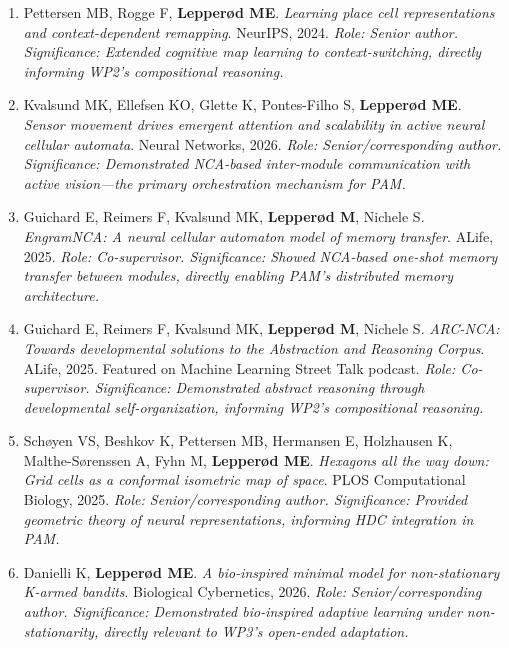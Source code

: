 \begin{enumerate}[noitemsep,topsep=2pt]
  \item Pettersen MB, Rogge F, \textbf{Lepperød ME}. \textit{Learning place cell representations and context-dependent remapping}. NeurIPS, 2024.
  \textit{Role: Senior author. Significance: Extended cognitive map learning to context-switching, directly informing WP2's compositional reasoning.}

  \item Kvalsund MK, Ellefsen KO, Glette K, Pontes-Filho S, \textbf{Lepperød ME}. \textit{Sensor movement drives emergent attention and scalability in active neural cellular automata}. Neural Networks, 2026.
  \textit{Role: Senior/corresponding author. Significance: Demonstrated NCA-based inter-module communication with active vision---the primary orchestration mechanism for PAM.}

  \item Guichard E, Reimers F, Kvalsund MK, \textbf{Lepperød M}, Nichele S. \textit{EngramNCA: A neural cellular automaton model of memory transfer}. ALife, 2025.
  \textit{Role: Co-supervisor. Significance: Showed NCA-based one-shot memory transfer between modules, directly enabling PAM's distributed memory architecture.}

  \item Guichard E, Reimers F, Kvalsund MK, \textbf{Lepperød M}, Nichele S. \textit{ARC-NCA: Towards developmental solutions to the Abstraction and Reasoning Corpus}. ALife, 2025. Featured on Machine Learning Street Talk podcast.
  \textit{Role: Co-supervisor. Significance: Demonstrated abstract reasoning through developmental self-organization, informing WP2's compositional reasoning.}

  \item Schøyen VS, Beshkov K, Pettersen MB, Hermansen E, Holzhausen K, Malthe-Sørenssen A, Fyhn M, \textbf{Lepperød ME}. \textit{Hexagons all the way down: Grid cells as a conformal isometric map of space}. PLOS Computational Biology, 2025.
  \textit{Role: Senior/corresponding author. Significance: Provided geometric theory of neural representations, informing HDC integration in PAM.}

  \item Danielli K, \textbf{Lepperød ME}. \textit{A bio-inspired minimal model for non-stationary K-armed bandits}. Biological Cybernetics, 2026.
  \textit{Role: Senior/corresponding author. Significance: Demonstrated bio-inspired adaptive learning under non-stationarity, directly relevant to WP3's open-ended adaptation.}
\end{enumerate}

